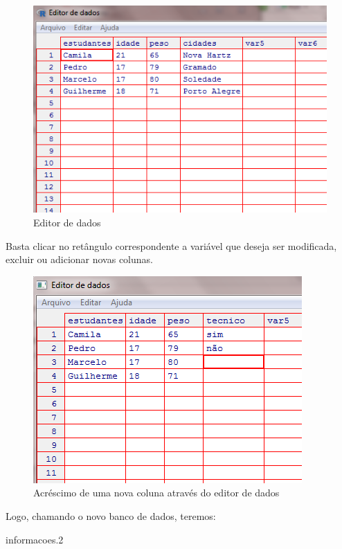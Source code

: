 \documentclass[12pt,brazil,oneside]{book}
\newenvironment{Shaded}{\begin{snugshade}}{\end{snugshade}}
\newcommand{\FloatTok}[1]{\textcolor[rgb]{0.00,0.00,0.81}{#1}}
\newcommand{\NormalTok}[1]{#1}
\begin{document}
\begin{figure}[H]

{\centering \includegraphics[width=0.8\linewidth]{95} 

}

\caption{Editor de dados}\label{fig:95}
\end{figure}

Basta clicar no retângulo correspondente a variável que deseja ser
modificada, excluir ou adicionar novas colunas.

\begin{figure}[H]

{\centering \includegraphics[width=0.8\linewidth]{10} 

}

\caption{Acréscimo de uma nova coluna através do editor de dados}\label{fig:10}
\end{figure}

Logo, chamando o novo banco de dados, teremos:

\begin{Shaded}
\begin{Highlighting}[]
\NormalTok{informacoes}\FloatTok{.2} 
\end{Highlighting}
\end{Shaded}
\end{document}
